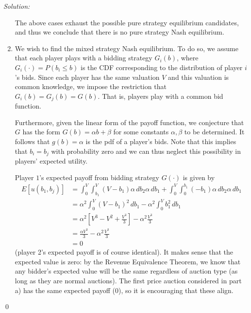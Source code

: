 \documentclass[12pt]{article}
\newenvironment{sol}
    {\emph{Solution:}
    }
    {
    \qed
    }
\begin{document}
\begin{sol}
\begin{enumerate}[label=\alph*) ]
    The above cases exhaust the possible pure strategy equilibrium candidates, and thus we conclude that there is no pure strategy Nash equilibrium.

    \item We wish to find the mixed strategy Nash equilibrium. To do so, we assume that each player plays with a bidding strategy $G_i(b)$, where $G_i(\cdot) = P(b_i \leq b)$ is the CDF corresponding to the distribution of player $i$'s bids. Since each player has the same valuation $V$ and this valuation is common knowledge, we impose the restriction that $G_i(b) = G_j(b) = G(b)$. That is, players play with a common bid function. 
    
    Furthermore, given the linear form of the payoff function, we conjecture that $G$ has the form $G(b) = \alpha b + \beta$ for some constants $\alpha, \beta$ to be determined. It follows that $g(b) = \alpha$ is the pdf of a player's bids. Note that this implies that $b_i = b_j$ with probability zero and we can thus neglect this possibility in players' expected utility. 
    
    Player $1$'s expected payoff from bidding strategy $G(\cdot)$ is given by
    \begin{align*}E[u(b_1, b_{j})] &= \int_{0}^{V} \int_{b_1}^V (V-b_1)\alpha \, d b_2  \alpha \, d b_1 + \int_{0}^{V} \int_{0}^{b_1} (-b_1)\alpha \, d b_2  \alpha \, d b_1 \\
        &= \alpha^2 \int_{0}^{V} (V - b_1)^2 \, d b_1 - \alpha^2 \int_{0}^V b_1^2 \, d b_1\\
        &= \alpha^2 \left[ V^3 - V^2 + \frac{V^3}{3}\right] - \alpha^2 \frac{V^3}{3}\\
        &= \frac{\alpha V^3}{3} - \alpha^2 \frac{V^3}{3}\\
        &= 0
    \end{align*}
    (player 2's expected payoff is of course identical). It makes sense that the expected value is zero: by the Revenue Equivalence Theorem, we know that any bidder's expected value will be the same regardless of auction type (as long as they are normal auctions). The first price auction considered in part a) has the same expected payoff (0), so it is encouraging that these align.


\end{enumerate}
\end{sol}
\end{document}
